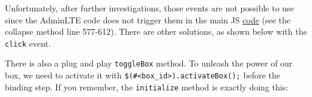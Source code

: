 \documentclass[
]{book}
\newenvironment{Shaded}{\begin{snugshade}}{\end{snugshade}}
\newcommand{\AttributeTok}[1]{\textcolor[rgb]{0.77,0.63,0.00}{#1}}
\newcommand{\CommentTok}[1]{\textcolor[rgb]{0.56,0.35,0.01}{\textit{#1}}}
\newcommand{\ControlFlowTok}[1]{\textcolor[rgb]{0.13,0.29,0.53}{\textbf{#1}}}
\newcommand{\DataTypeTok}[1]{\textcolor[rgb]{0.13,0.29,0.53}{#1}}
\newcommand{\KeywordTok}[1]{\textcolor[rgb]{0.13,0.29,0.53}{\textbf{#1}}}
\newcommand{\NormalTok}[1]{#1}
\newcommand{\OperatorTok}[1]{\textcolor[rgb]{0.81,0.36,0.00}{\textbf{#1}}}
\newcommand{\StringTok}[1]{\textcolor[rgb]{0.31,0.60,0.02}{#1}}
\newcommand{\VariableTok}[1]{\textcolor[rgb]{0.00,0.00,0.00}{#1}}
\begin{document}
Unfortunately, after further investigations, those events are not possible to use since the AdminLTE code does not trigger them in the main JS \href{https://github.com/rstudio/shinydashboard/blob/master/srcjs/AdminLTE/app.js}{code} (see the collapse method line 577-612). There are other solutions, as shown below with the \texttt{click} event.

There is also a plug and play \texttt{toggleBox} method. To unleash the power of our box, we need to activate it with \texttt{\$(\textquotesingle{}\#\textless{}box\_id\textgreater{}\textquotesingle{}).activateBox();} before the binding step. If you remember, the \texttt{initialize} method is exactly doing this:

\begin{Shaded}
\end{Shaded}
\end{document}
